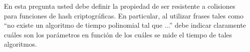 En esta pregunta usted debe definir la propiedad de ser resistente a colisiones para funciones de hash criptográficas. En particular, al utilizar frases tales como ``no existe un algoritmo de tiempo polinomial tal que ...''  debe indicar claramente cuáles son los parámetros en función de los cuáles se mide el tiempo de tales algoritmos.
